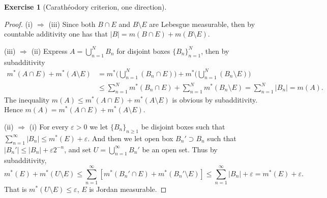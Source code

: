 \documentclass[a4paper]{article}
\newtheorem{ex}{Exercise}[subsection]
\begin{document}
\begin{ex}[Carath\'eodory criterion, one direction]\end{ex}
\begin{proof}
(i) $\Rightarrow$ (iii) Since both $B \cap E$ and $B \setminus E$ are Lebesgue measurable, then by countable additivity
one has that $|B| = m(B \cap E) + m(B \setminus E)$.

(iii) $\Rightarrow$ (ii) Express $A = \bigcup_{n = 1}^N B_n$ for disjoint boxes $\{B_n\}_{n = 1}^N$, then by subadditivity
\begin{align*}
m^*(A \cap E) + m^*(A \setminus E) &= m^*\Big( \bigcup_{n = 1}^N (B_n \cap E)\Big) + m^*\Big(\bigcup_{n = 1}^N 
(B_n \setminus E)\Big) \\
&\leq \sum_{n = 1}^N m^*(B_n \cap E) + \sum_{n = 1}^N m^*(B_n \setminus E) = \sum_{n = 1}^N |B_n| = m(A).
\end{align*}
The inequality $m(A) \leq m^*(A \cap E) + m^*(A \setminus E)$ is obvious by subadditivity. Hence 
$m(A) = m^*(A \cap E) + m^*(A \setminus E)$.

(ii) $\Rightarrow$ (i) For every $\varepsilon > 0$ we let $\{B_n\}_{n \geq 1}$ be disjoint boxes such that 
$\sum_{n = 1}^\infty |B_n| \leq m^*(E) +  \varepsilon$. And then we let open box $B_n' \supset B_n$ such that 
$|B_n'| \leq |B_n| + \varepsilon 2^{-n}$, and set $U = \bigcup_{n = 1}^\infty B_n'$ be an open set. Thus by 
subadditivity, $$
m^*(E) + m^*(U \setminus E) \leq \sum_{n = 1}^\infty [m^*(B_n' \cap E) + m^*(B_n' \setminus E)] 
\leq \sum_{n = 1}^\infty |B_n| + \varepsilon = m^*(E) + \varepsilon.
$$That is $m^*(U \setminus E) \leq \varepsilon$, $E$ is Jordan measurable.
\end{proof}
\end{document}
